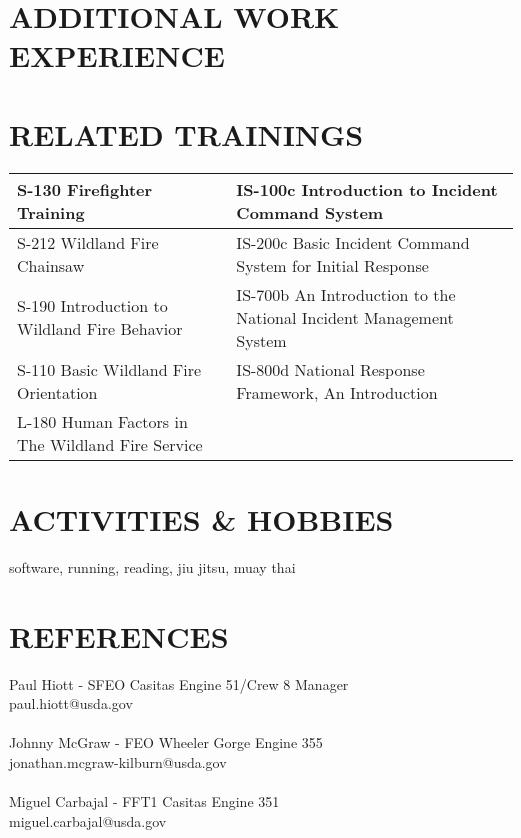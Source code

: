 \documentclass[a4paper,9pt]{extarticle}
\begin{document}
\section*{ADDITIONAL WORK EXPERIENCE}
\AstroCarto
\MilkAndHoney
\Eureka
\OdysseySpaceResearch
\SentriForce
\LakeridgeTownhomes

\section*{RELATED TRAININGS}

\begin{center}
\begin{tabular}{|l|l|}
    \hline
    S-130 Firefighter Training & IS-100c Introduction to Incident Command System \\
    \hline
    S-212 Wildland Fire Chainsaw & IS-200c Basic Incident Command System for Initial Response \\
    \hline
    S-190 Introduction to Wildland Fire Behavior & IS-700b An Introduction to the National Incident Management System \\
    \hline
    S-110 Basic Wildland Fire Orientation & IS-800d National Response Framework, An Introduction \\
    \hline
    L-180 Human Factors in The Wildland Fire Service & \\
    \hline
\end{tabular}
\end{center}

\FFCertifications

\section*{ACTIVITIES \& HOBBIES}
software, running, reading, jiu jitsu, muay thai

\section*{REFERENCES}
Paul Hiott - SFEO Casitas Engine 51/Crew 8 Manager\\
paul.hiott@usda.gov\\\\

\noindent Johnny McGraw - FEO Wheeler Gorge Engine 355\\
jonathan.mcgraw-kilburn@usda.gov\\\\

\noindent Miguel Carbajal - FFT1 Casitas Engine 351\\
miguel.carbajal@usda.gov
\end{document}

